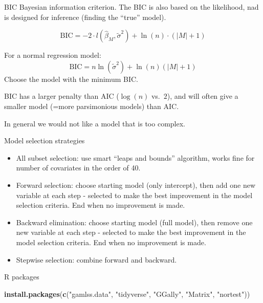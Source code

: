 \documentclass[
  ignorenonframetext,
]{beamer}
\newenvironment{Shaded}{\begin{snugshade}}{\end{snugshade}}
\newcommand{\FunctionTok}[1]{\textcolor[rgb]{0.13,0.29,0.53}{\textbf{#1}}}
\newcommand{\NormalTok}[1]{#1}
\newcommand{\StringTok}[1]{\textcolor[rgb]{0.31,0.60,0.02}{#1}}
\begin{document}
\begin{frame}{BIC Bayesian information criterion.}
\label{bic-bayesian-information-criterion.}
The BIC is also based on the likelihood, nad is designed for inference
(finding the ``true'' model).

\[\text{BIC} =-2 \cdot l(\hat{\beta}_M,\tilde{\sigma}^2)+\ln(n)\cdot (\lvert M\rvert +1)\]

For a normal regression model:
\[ \text{BIC}= n\ln(\tilde{\sigma}^2)+\ln(n)(\lvert M\rvert +1)\] Choose
the model with the minimum BIC.

BIC has a larger penalty than AIC (\(\log(n)\) vs.~\(2\)), and will
often give a smaller model (=more parsimonious models) than AIC.

In general we would not like a model that is too complex.
\end{frame}

\begin{frame}{Model selection strategies}
\label{model-selection-strategies}
\begin{itemize}
\item
  All subset selection: use smart ``leaps and bounds'' algorithm, works
  fine for number of covariates in the order of 40.
\item
  Forward selection: choose starting model (only intercept), then add
  one new variable at each step - selected to make the best improvement
  in the model selection criteria. End when no improvement is made.
\item
  Backward elimination: choose starting model (full model), then remove
  one new variable at each step - selected to make the best improvement
  in the model selection criteria. End when no improvement is made.
\item
  Stepwise selection: combine forward and backward.
\end{itemize}
\end{frame}

\begin{frame}[fragile]{R packages}
\label{r-packages}
\begin{Shaded}
\begin{Highlighting}[]
\FunctionTok{install.packages}\NormalTok{(}\FunctionTok{c}\NormalTok{(}\StringTok{"gamlss.data"}\NormalTok{, }\StringTok{"tidyverse"}\NormalTok{, }\StringTok{"GGally"}\NormalTok{, }\StringTok{"Matrix"}\NormalTok{, }\StringTok{"nortest"}\NormalTok{))}
\end{Highlighting}
\end{Shaded}
\end{frame}
\end{document}
